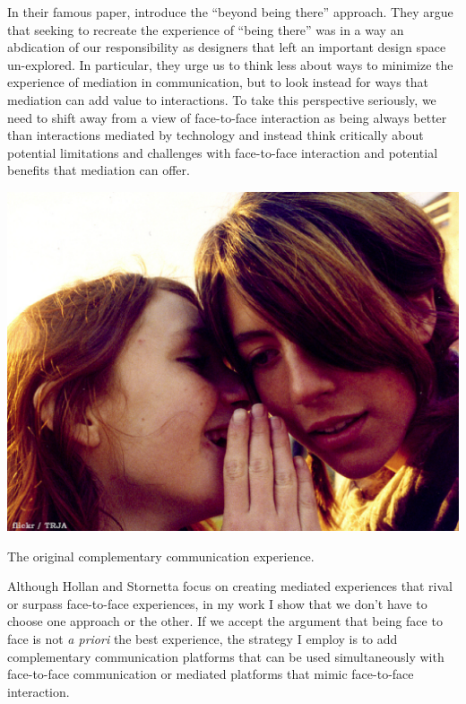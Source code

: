 In their famous paper, \citet{Hollan:1992tz} introduce the ``beyond being there'' approach. They argue that seeking to recreate the experience of ``being there'' was in a way an abdication of our responsibility as designers that left an important design space un-explored. In particular, they urge us to think less about ways to minimize the experience of mediation in communication, but to look instead for ways that mediation can add value to interactions. To take this perspective seriously, we need to shift away from a view of face-to-face interaction as being always better than interactions mediated by technology and instead think critically about potential limitations and challenges with face-to-face interaction and potential benefits that mediation can offer. 

\begin{marginfigure}
	\includegraphics{figures/whisper.png}
	\caption{The original complementary communication experience.}
	\label{fig:whisper}
\end{marginfigure}


Although Hollan and Stornetta focus on creating mediated experiences that rival or surpass face-to-face experiences, in my work I show that we don't have to choose one approach or the other. If we accept the argument that being face to face is not \emph{a priori} the best experience, the strategy I employ is to add complementary communication platforms that can be used simultaneously with face-to-face communication or mediated platforms that mimic face-to-face interaction.


